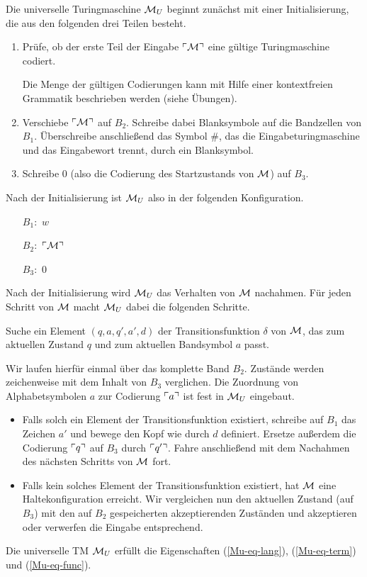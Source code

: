 Die universelle Turingmaschine $\mathcal{M}_U$ beginnt zunächst mit einer Initialisierung, die aus den folgenden drei Teilen besteht.

\begin{enumerate}
 \item Prüfe, ob der erste Teil der Eingabe $\ulcorner \mathcal{M} \urcorner$ eine gültige Turingmaschine codiert.
 
 Die Menge der gültigen Codierungen kann mit Hilfe einer kontextfreien Grammatik beschrieben werden (siehe Übungen).
 
 \item Verschiebe $\ulcorner \mathcal{M} \urcorner$ auf $B_2$. Schreibe dabei Blanksymbole auf die Bandzellen von $B_1$.
 Überschreibe anschließend das Symbol $\#$, das die Eingabeturingmaschine und das Eingabewort trennt, durch ein Blanksymbol.
 
 \item Schreibe $0$ (also die Codierung des Startzustands von $\mathcal{M}$) auf $B_3$.
\end{enumerate}

Nach der Initialisierung ist $\mathcal{M}_U$ also in der folgenden Konfiguration.
\begin{itemize}
\item[$B_1:$] $w$
\item[$B_2:$] $\ulcorner \mathcal{M} \urcorner$
\item[$B_3:$] $0$
\end{itemize}

Nach der Initialisierung wird $\mathcal{M}_U$ das Verhalten von $\mathcal{M}$ nachahmen.
Für jeden Schritt von $\mathcal{M}$ macht $\mathcal{M}_U$ dabei die folgenden Schritte.

 Suche ein Element $(q, a, q', a', d)$ der Transitionsfunktion $\delta$ von $\mathcal{M}$, das zum aktuellen Zustand $q$ und zum aktuellen Bandsymbol $a$ passt.
 
 Wir laufen hierfür einmal über das komplette Band $B_2$. 
 Zustände werden zeichenweise mit dem Inhalt von $B_3$ verglichen.
 Die Zuordnung von Alphabetsymbolen $a$ zur Codierung $\ulcorner a \urcorner$ ist fest in $\mathcal{M}_U$ eingebaut.
 
 \begin{itemize}
 
 \item Falls solch ein Element der Transitionsfunktion existiert,
    schreibe auf $B_1$ das Zeichen $a'$ und bewege den Kopf wie durch $d$ definiert.
    Ersetze außerdem die Codierung $\ulcorner q \urcorner$ auf $B_3$ durch $\ulcorner q' \urcorner$.
    Fahre anschließend mit dem Nachahmen des nächsten Schritts von $\mathcal{M}$ fort.
    
 \item Falls kein solches Element der Transitionsfunktion existiert, hat $\mathcal{M}$ eine Haltekonfiguration erreicht.
 Wir vergleichen nun den aktuellen Zustand (auf $B_3$) mit den auf $B_2$ gespeicherten akzeptierenden Zuständen und akzeptieren oder verwerfen die Eingabe entsprechend.

\end{itemize}

\begin{Satz}[name={[Universelle \ac{TM}]}]
	Die universelle \ac{TM} $\mathcal{M}_U$ erfüllt die Eigenschaften (\ref{Mu-eq-lang}), (\ref{Mu-eq-term}) und (\ref{Mu-eq-func}).
\end{Satz}


